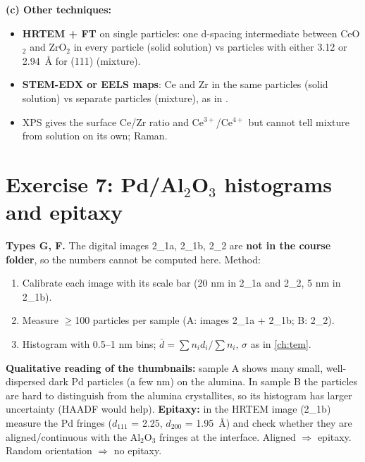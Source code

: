 \textbf{(c) Other techniques:}
\begin{itemize}
  \item \textbf{HRTEM + FT} on single particles: one d-spacing intermediate between CeO$_2$ and ZrO$_2$ in every particle
        (solid solution) vs particles with either 3.12 or \SI{2.94}{\angstrom} for (111) (mixture).
  \item \textbf{STEM-EDX or EELS maps}: Ce and Zr in the same particles (solid solution) vs separate particles (mixture),
        as in .
  \item XPS gives the surface Ce/Zr ratio and Ce$^{3+}$/Ce$^{4+}$ but cannot tell mixture from solution on its own; Raman\extra.
\end{itemize}

\section{Exercise 7: Pd/Al$_2$O$_3$ histograms and epitaxy}
\textbf{Types G, F.} The digital images 2\_1a, 2\_1b, 2\_2 are \textbf{not in the course folder}, so the numbers cannot be
computed here. Method:
\begin{enumerate}
  \item Calibrate each image with its scale bar (20 nm in 2\_1a and 2\_2, 5 nm in 2\_1b).
  \item Measure $\geq$100 particles per sample (A: images 2\_1a + 2\_1b; B: 2\_2).
  \item Histogram with 0.5--1 nm bins; $\bar d = \sum n_id_i/\sum n_i$, $\sigma$ as in \cref{ch:tem}.
\end{enumerate}
\textbf{Qualitative reading of the thumbnails:} sample A shows many small, well-dispersed dark Pd particles (a few nm) on
the alumina. In sample B the particles are hard to distinguish from the alumina crystallites, so its histogram has larger
uncertainty (HAADF would help).
\textbf{Epitaxy:} in the HRTEM image (2\_1b) measure the Pd fringes ($d_{111}$ = 2.25, $d_{200}$ = \SI{1.95}{\angstrom}) and check
whether they are aligned/continuous with the Al$_2$O$_3$ fringes at the interface. Aligned $\Rightarrow$ epitaxy.
Random orientation $\Rightarrow$ no epitaxy.

